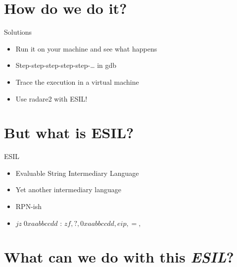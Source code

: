 \documentclass{beamer}
\begin{document}
\section{How do we do it?}

\begin{frame}{Solutions}
	\begin{itemize}[<+->]
		\item Run it on your machine and see what happens
		\item Step-step-step-step-step-… in gdb
		\item Trace the execution in a virtual machine
		\item Use radare2 with \alert{ESIL}!
	\end{itemize}
\end{frame}

\section{But what is ESIL?}

\begin{frame}{ESIL}
	\begin{itemize}
		\item Evaluable String Intermediary Language
		\item Yet another intermediary language
		\item RPN-ish
		\item \alert{$jz\;0xaabbccdd$} :  $zf,?{,0xaabbccdd,eip,=,}$
	\end{itemize}
\end{frame}

\section{What can we do with this \emph{ESIL}?}
\end{document}
